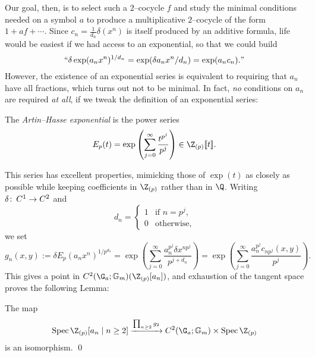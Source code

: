 Our goal, then, is to select such a $2$--cocycle $f$ and study the minimal conditions needed on a symbol $a$ to produce a multiplicative $2$--cocycle of the form $1 + af + \cdots$.  Since $c_n = \frac{1}{d_n} \delta(x^n)$  is itself produced by an additive formula, life would be easiest if we had access to an exponential, so that we could build \[\text{``$ \delta \exp(a_n x^n)^{1/d_n} = \exp(\delta a_n x^n / d_n) = \exp(a_n c_n). $''}\]  However, the existence of an exponential series is equivalent to requiring that $a_n$ have all fractions, which turns out not to be minimal.  In fact, \emph{no} conditions on $a_n$ are required \emph{at all}, if we tweak the definition of an exponential series:

\begin{definition}
The \textit{Artin--Hasse exponential} is the power series \[E_p(t) = \exp\left( \sum_{j=0}^\infty \frac{t^{p^j}}{p^j} \right) \in \Z_{(p)}\ps{t}.\]
\end{definition}

This series has excellent properties, mimicking those of $\exp(t)$ as closely as possible while keeping coefficients in $\Z_{(p)}$ rather than in $\Q$.  Writing $\delta\colon\thinspace C^1 \to C^2$ and \[d_n = \begin{cases} 1 & \text{if $n = p^j$}, \\ 0 & \text{otherwise}, \end{cases}\] we set \[g_n(x, y) := \delta E_p(a_n x^n)^{1/p^{d_n}} = \exp\left( \sum_{j=0}^\infty \frac{a_n^{p^j} \delta x^{np^j}}{p^{j + d_n}} \right) = \exp\left( \sum_{j=0}^\infty \frac{a_n^{p^j} c_{np^j}(x, y)}{p^j} \right).\]  This gives a point in $C^2(\G_a; \Gm)(\Z_{(p)}[a_n])$, and exhaustion of the tangent space proves the following Lemma:

\begin{lemma}
The map \[\Spec \Z_{(p)}[a_n \mid n \ge 2] \xrightarrow{\prod_{n \ge 2} g_2} C^2(\G_a; \Gm) \times \Spec \Z_{(p)}\] is an isomorphism. \qed
\end{lemma}

